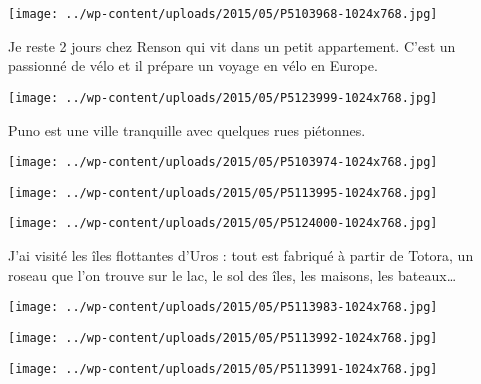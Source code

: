 \centerline{\texttt{[image: ../wp-content/uploads/2015/05/P5103968-1024x768.jpg]} } 
 \newline
 Je reste 2 jours chez Renson qui vit dans un petit appartement. C'est un passionné de vélo et il prépare un voyage en vélo en Europe. \newline
 \newline
\centerline{\texttt{[image: ../wp-content/uploads/2015/05/P5123999-1024x768.jpg]} } 
 \newline
 Puno est une ville tranquille avec quelques rues piétonnes. \newline
 \newline
\centerline{\texttt{[image: ../wp-content/uploads/2015/05/P5103974-1024x768.jpg]} } 
 \newline
 \newline
\centerline{\texttt{[image: ../wp-content/uploads/2015/05/P5113995-1024x768.jpg]} } 
 \newline
 \newline
\centerline{\texttt{[image: ../wp-content/uploads/2015/05/P5124000-1024x768.jpg]} } 
 \newline
 J'ai visité les îles flottantes d'Uros : tout est fabriqué à partir de Totora, un roseau que l'on trouve sur le lac, le sol des îles, les maisons, les bateaux… \newline
 \newline
\centerline{\texttt{[image: ../wp-content/uploads/2015/05/P5113983-1024x768.jpg]} } 
 \newline
 \newline
\centerline{\texttt{[image: ../wp-content/uploads/2015/05/P5113992-1024x768.jpg]} } 
 \newline
 \newline
\centerline{\texttt{[image: ../wp-content/uploads/2015/05/P5113991-1024x768.jpg]} } 
 \newline

\newpage
 
